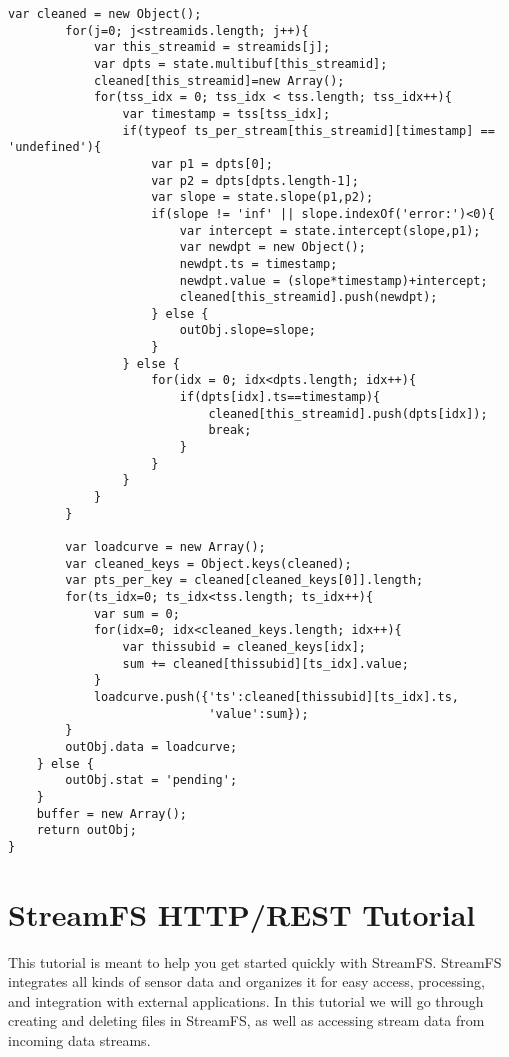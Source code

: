 \begin{lstlisting}[caption={Load curve code used to generate aggregate load curves in the Energy Lens application.},label={code:loadcurve_full}]
        var cleaned = new Object();
        for(j=0; j<streamids.length; j++){
            var this_streamid = streamids[j];
            var dpts = state.multibuf[this_streamid];
            cleaned[this_streamid]=new Array();
            for(tss_idx = 0; tss_idx < tss.length; tss_idx++){
                var timestamp = tss[tss_idx];
                if(typeof ts_per_stream[this_streamid][timestamp] == 'undefined'){
                    var p1 = dpts[0];
                    var p2 = dpts[dpts.length-1];
                    var slope = state.slope(p1,p2);
                    if(slope != 'inf' || slope.indexOf('error:')<0){
                        var intercept = state.intercept(slope,p1);
                        var newdpt = new Object();
                        newdpt.ts = timestamp;
                        newdpt.value = (slope*timestamp)+intercept;
                        cleaned[this_streamid].push(newdpt);
                    } else {
                        outObj.slope=slope;
                    }
                } else {
                    for(idx = 0; idx<dpts.length; idx++){
                        if(dpts[idx].ts==timestamp){
                            cleaned[this_streamid].push(dpts[idx]);
                            break;
                        }
                    }
                }
            }
        }
       
        var loadcurve = new Array(); 
        var cleaned_keys = Object.keys(cleaned);
        var pts_per_key = cleaned[cleaned_keys[0]].length;
        for(ts_idx=0; ts_idx<tss.length; ts_idx++){
            var sum = 0;
            for(idx=0; idx<cleaned_keys.length; idx++){
                var thissubid = cleaned_keys[idx];
                sum += cleaned[thissubid][ts_idx].value;
            }
            loadcurve.push({'ts':cleaned[thissubid][ts_idx].ts,
                            'value':sum});
        }
        outObj.data = loadcurve;
    } else {
        outObj.stat = 'pending';
    }
    buffer = new Array();
    return outObj;
}
\end{lstlisting}




\chapter{StreamFS HTTP/REST Tutorial}
\label{appendix:tutorial}

This tutorial is meant to help you get started quickly with StreamFS. StreamFS integrates all kinds of sensor data and organizes it for easy access, processing, and integration with external applications. In this tutorial we will go through creating and deleting files in StreamFS, as well as accessing stream data from incoming data streams.

